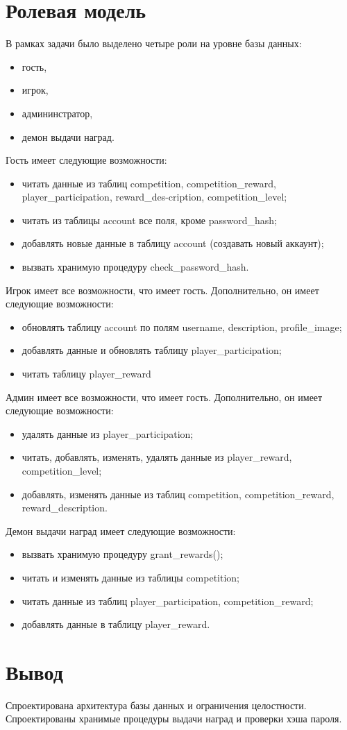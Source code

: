 \section{Ролевая модель}
В рамках задачи было выделено четыре роли на уровне базы данных:
\begin{itemize}
	\item гость,
	\item игрок,
	\item админинстратор,
	\item демон выдачи наград.
\end{itemize}
Гость имеет следующие возможности:
\begin{itemize}
	\item читать данные из таблиц competition, competition\_reward, player\_participation, reward\_des-cription, competition\_level;
	\item читать из таблицы account все поля, кроме password\_hash;
	\item добавлять новые данные в таблицу account (создавать новый аккаунт);
	\item вызвать хранимую процедуру check\_password\_hash.
\end{itemize}
Игрок имеет все возможности, что имеет гость. Дополнительно, он имеет следующие возможности:
\begin{itemize}
	\item обновлять таблицу account по полям username, description, profile\_image;
	\item добавлять данные и обновлять таблицу player\_participation;
	\item читать таблицу player\_reward
\end{itemize}
Админ имеет все возможности, что имеет гость. Дополнительно, он имеет следующие возможности:
\begin{itemize}
	\item удалять данные из player\_participation;
	\item читать, добавлять, изменять, удалять данные из player\_reward, competition\_level;
	\item добавлять, изменять данные из таблиц competition, competition\_reward, reward\_description.
\end{itemize}
Демон выдачи наград имеет следующие возможности:
\begin{itemize}
	\item вызвать хранимую процедуру grant\_rewards();
	\item читать и изменять данные из таблицы competition;
	\item читать данные из таблиц player\_participation, competition\_reward;
	\item добавлять данные в таблицу player\_reward.
\end{itemize}


\section*{Вывод}

Спроектирована архитектура базы данных и ограничения целостности. Спроектированы хранимые процедуры выдачи наград и проверки хэша пароля.
\clearpage
